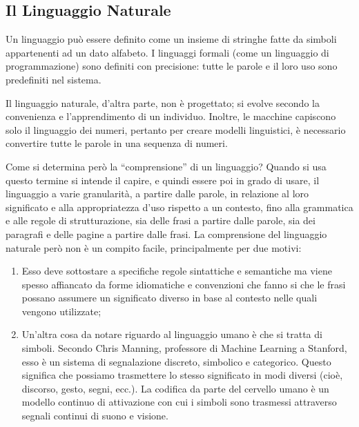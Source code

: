 \subsection{Il Linguaggio Naturale}
Un linguaggio può essere definito come un insieme di stringhe fatte da simboli appartenenti ad un dato alfabeto. I linguaggi formali (come un linguaggio di programmazione) sono definiti con precisione: tutte le parole e il loro uso sono predefiniti nel sistema.

Il linguaggio naturale, d'altra parte, non è progettato; si evolve secondo la convenienza e l'apprendimento di un individuo. Inoltre, le macchine capiscono solo il linguaggio dei numeri, pertanto per creare modelli linguistici, è necessario convertire tutte le parole in una sequenza di numeri.

Come si determina però la “comprensione” di un linguaggio? Quando si usa questo termine si intende il capire, e quindi essere poi in grado di usare, il linguaggio a varie granularità, a partire dalle parole, in relazione al loro significato e alla appropriatezza d’uso rispetto a un contesto, fino alla grammatica e alle regole di strutturazione, sia delle frasi a partire dalle parole, sia dei paragrafi e delle pagine a partire dalle frasi.
La comprensione del linguaggio naturale però non è un compito facile, principalmente per due motivi:
\begin{enumerate}
    \item Esso deve sottostare a specifiche regole sintattiche e semantiche ma viene spesso affiancato da forme idiomatiche e convenzioni che fanno si che le frasi possano assumere un significato diverso in base al contesto nelle quali vengono utilizzate;
    \item Un'altra cosa da notare riguardo al linguaggio umano è che si tratta di simboli. Secondo Chris Manning, professore di Machine Learning a Stanford, esso è un sistema di segnalazione discreto, simbolico e categorico. Questo significa che possiamo trasmettere lo stesso significato in modi diversi (cioè, discorso, gesto, segni, ecc.). La codifica da parte del cervello umano è un modello continuo di attivazione con cui i simboli sono trasmessi attraverso segnali continui di suono e visione.
\end{enumerate}